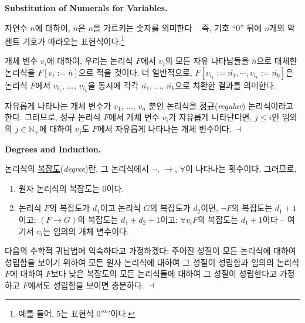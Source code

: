 \documentclass[12pt]{paper}
\newenvironment{context}[1][]
{ \noindent \textbf{{#1}.}
}
{ \hfill $ \dashv $
}
\begin{document}
\begin{context}[Substitution of Numerals for Variables]
자연수 $n$에 대하여, $\overline{n}$은 $n$을 가르키는 숫자를 의미한다 --
즉, 기호 ``$0$'' 뒤에 $n$개의 악센트 기호가 따라오는 표현식이다.\footnote
{
예를 들어, $\overline{5}$는 표현식 $0'''''$이다.
}

개체 변수 $v_{i}$에 대하여, 우리는 논리식 $F$에서 $v_{i}$의 모든 자유 나타남들을 $\overline{n}$으로 대체한 논리식을 $F \left[ v_{i} := \overline{n} \right]$으로 적을 것이다.
더 일반적으로, $F \left[ v_{i_{1}} := \overline{n_{1}} , \cdots , v_{i_{k}} := \overline{n_{k}} \right]$은 논리식 $F$에서 $v_{i_{1}}$, ..., $v_{i_{k}}$을 동시에 각각 $\overline{n_{1}}$, ..., $\overline{n_{k}}$으로 치환한 결과를 의미한다.

자유롭게 나타나는 개체 변수가 $v_{1}$, ..., $v_{n}$ 뿐인 논리식을 \underline{정규}(\textit{regular}) 논리식이라고 한다.
그러므로, 정규 논리식 $F$에서 개체 변수 $v_{i}$가 자유롭게 나타난다면,
$j \leq i$인 임의의 $j \in \mathbb{N}_{+}$에 대하여 $v_{j}$도 $F$에서 자유롭게 나타나는 개체 변수이다.
\end{context}

\begin{context}[Degrees and Induction]
논리식의 \underline{복잡도}(\textit{degree})란, 그 논리식에서 $\lnot$, $\rightarrow$, $\forall$이 나타나는 횟수이다.
그러므로,
\begin{enumerate}
\item 원자 논리식의 복잡도는 $0$이다.
\item 논리식 $F$의 복잡도가 $d_{1}$이고 논리식 $G$의 복잡도가 $d_{2}$이면,
$\lnot F$의 복잡도는 $d_{1} + 1$이고;
$\left( F \rightarrow G \right)$의 복잡도는 $d_{1} + d_{2} + 1$이고;
$\forall v_{i} F$의 복잡도는 $d_{1} + 1$이다 --
여기서 $v_{i}$는 임의의 개체 변수이다.
\end{enumerate}

다음의 수학적 귀납법에 익숙하다고 가정하겠다:
주어진 성질이 모든 논리식에 대하여 성립함을 보이기 위하여
모든 원자 논리식에 대하여 그 성질이 성립함과
임의의 논리식 $F$에 대하여 $F$보다 낮은 복잡도의 모든 논리식들에 대하여 그 성질이 성립한다고 가정하고
$F$에서도 성립함을 보이면 충분하다.
\end{context}
\end{document}
